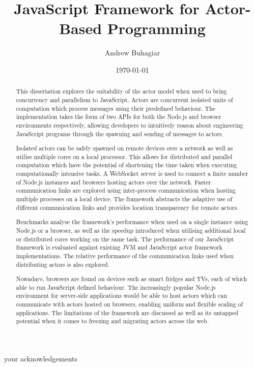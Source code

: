 \documentclass[12pt, a4paper]{report}
\theoremstyle{definition}
\theoremstyle{definition}%
\theoremstyle{definition}%
\theoremstyle{definition}%
\theoremstyle{definition}%
\theoremstyle{definition}%
\begin{document}
\title{JavaScript Framework for Actor-Based Programming}
\author{Andrew Buhagiar}
\date{\today}

\frontmatter

\begin{acknowledgements}
your acknowledgements
\end{acknowledgements}
       
\begin{abstract}
This dissertation explores the suitability of the actor model when used to bring concurrency and parallelism to JavaScript. Actors are concurrent isolated units of computation which process messages using their predefined behaviour. The implementation takes the form of two APIs for both the Node.js and browser environments respectively, allowing developers to intuitively reason about engineering JavaScript programs through the spawning and sending of messages to actors.

Isolated actors can be safely spawned on remote devices over a network as well as utilise multiple cores on a local processor. This allows for distributed and parallel computation which have the potential of shortening the time taken when executing computationally intensive tasks. A WebSocket server is used to connect a finite number of Node.js instances and browsers hosting actors over the network. Faster communication links are explored using inter-process communication when hosting multiple processes on a local device. The framework abstracts the adaptive use of different communication links and provides location transparency for remote actors.

Benchmarks analyse the framework’s performance when used on a single instance using Node.js or a browser, as well as the speedup introduced when utilising additional local or distributed cores working on the same task. The performance of our JavaScript framework is evaluated against existing JVM and JavaScript actor framework implementations. The relative performance of the communication links used when distributing actors is also explored.

Nowadays, browsers are found on devices such as smart fridges and TVs, each of which able to run JavaScript defined behaviour. The increasingly popular Node.js environment for server-side applications would be able to host actors which can communicate with actors hosted on browsers, enabling uniform and flexible scaling of applications. The limitations of the framework are discussed as well as its untapped potential when it comes to freezing and migrating actors across the web.
\end{abstract}
\end{document}
